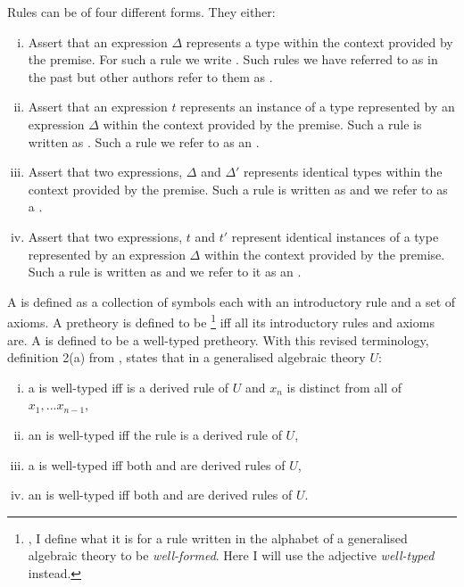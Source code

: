 Rules can be of four different forms. They either:

\begin{enumerate}[(i)]
\item Assert that an expression $\Delta$ represents a type within the context provided by the premise. For such a rule we write
. Such rules we have referred to as  \Trules in the past but other authors refer to them as .

\item Assert that an expression $t$ represents an instance of a type represented by an expression $\Delta$ within the context provided by the premise. Such a rule is written as
. Such a rule we refer to as an \trule.

\item Assert that two expressions, $\Delta$ and $\Delta'$ represents identical types within the context provided by the premise. Such a rule is written as 
 and we refer to as a \Teqrule.

\item Assert that two expressions, $t$ and $t'$ represent identical instances of a type represented by an expression $\Delta$  within the context provided by the premise. Such a rule is written as 
 and we  refer to it as an \teqrule.
\end{enumerate}


A  is defined as a collection of symbols each with an introductory rule and a set of axioms. A pretheory is defined to be \footnote{\cite{Cartmell86}, I define what it is for a rule written in the alphabet of a generalised algebraic theory to be \textit{well-formed}. Here I will use the adjective \textit{well-typed} instead.} iff all its introductory rules and axioms are. A  is defined to be a well-typed pretheory. 
With this revised terminology, definition 2(a) from \cite{Cartmell86}, states that in  a generalised algebraic theory $U$:
\begin{enumerate} [(i)]
\item 
a \Trule {} is well-typed  iff 
 is a derived rule of $U$ and $x_n$ is distinct from all of $x_1,...x_{n-1}$, 
\item 
an \trule {} is well-typed iff
the rule  is a derived rule of $U$,
\item 
a \Teqrule {} is well-typed iff
both  and  are derived rules
of $U$,
\item 
an \teqrule {} is well-typed iff
both  and  are derived rules
of $U$.
\end{enumerate}


